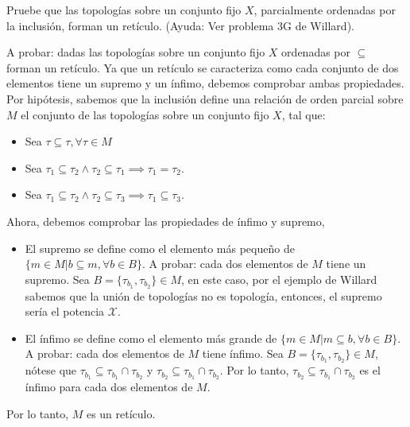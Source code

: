 \begin{problema}
    Pruebe que las topologías sobre un conjunto fijo $X$, parcialmente ordenadas por la inclusión, forman un retículo.
(Ayuda: Ver problema $3 \mathrm{G}$ de Willard).
\begin{dem}
    A probar: dadas las topologías sobre un conjunto fijo $X$ ordenadas por $\subseteq$ forman un retículo. Ya que un retículo se caracteriza como cada conjunto de dos elementos tiene un supremo y un ínfimo, debemos comprobar ambas propiedades. Por hipótesis, sabemos que la inclusión define una relación de orden parcial sobre $M$ el conjunto de las topologías sobre un conjunto fijo $X$, tal que: 
    \begin{itemize}
        \item Sea $\tau\subseteq \tau,\forall \tau\in M$
        \item Sea $\tau_1\subseteq \tau_2\wedge \tau_2\subseteq \tau_1\implies \tau_1=\tau_2$.
        \item Sea $\tau_1\subseteq\tau_2\wedge \tau_2\subseteq\tau_3\implies \tau_1\subseteq \tau_3$.
    \end{itemize}
    Ahora, debemos comprobar las propiedades de ínfimo y supremo,
    
    \begin{itemize}
        \item El supremo se define como el elemento más pequeño de $\{m\in M|b\subseteq m, \forall b\in B\}$. A probar: cada dos elementos de $M$ tiene un supremo. Sea $B=\{\tau_{b_1},\tau_{b_2}\}\in M$, en este caso, por el ejemplo de Willard sabemos que la unión de topologías no es topología, entonces, el supremo sería el potencia $\mathcal{X}$. 
        
        \item El ínfimo se define como el elemento más grande de $\{m\in M|m\subseteq b, \forall b\in B\}$. A probar: cada dos elementos de $M$ tiene ínfimo. Sea $B=\{\tau_{b_1},\tau_{b_2}\}\in M$, nótese que $\tau_{b_1}\subseteq \tau_{b_1}\cap \tau_{b_2}$ y $\tau_{b_2}\subseteq \tau_{b_1}\cap \tau_{b_2}$. Por lo tanto, $\tau_{b_2}\subseteq \tau_{b_1}\cap \tau_{b_2}$ es el ínfimo para cada dos elementos de $M$. 
    \end{itemize}
    Por lo tanto, $M$ es un retículo. 
\end{dem}
\end{problema}

